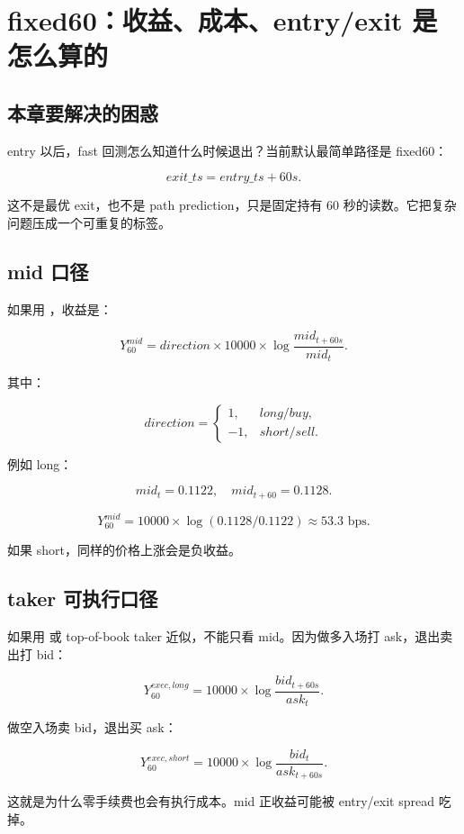 \chapter{fixed60：收益、成本、entry/exit 是怎么算的}

\section{本章要解决的困惑}

entry 以后，fast 回测怎么知道什么时候退出？当前默认最简单路径是 fixed60：

\[
exit\_ts = entry\_ts + 60s.
\]

这不是最优 exit，也不是 path prediction，只是固定持有 60 秒的读数。它把复杂问题压成一个可重复的标签。

\section{mid 口径}

如果用 ，收益是：

\[
Y^{mid}_{60}
= direction \times 10000 \times \log\frac{mid_{t+60s}}{mid_t}.
\]

其中：

\[
direction =
\begin{cases}
1, & long/buy,\\
-1, & short/sell.
\end{cases}
\]

例如 long：

\[
mid_t=0.1122,\quad mid_{t+60}=0.1128.
\]

\[
Y^{mid}_{60}
=10000 \times \log(0.1128/0.1122)
\approx 53.3\text{ bps}.
\]

如果 short，同样的价格上涨会是负收益。

\section{taker 可执行口径}

如果用  或 top-of-book taker 近似，不能只看 mid。因为做多入场打 ask，退出卖出打 bid：

\[
Y^{exec,long}_{60}
= 10000 \times \log\frac{bid_{t+60s}}{ask_t}.
\]

做空入场卖 bid，退出买 ask：

\[
Y^{exec,short}_{60}
= 10000 \times \log\frac{bid_t}{ask_{t+60s}}.
\]

这就是为什么零手续费也会有执行成本。mid 正收益可能被 entry/exit spread 吃掉。

